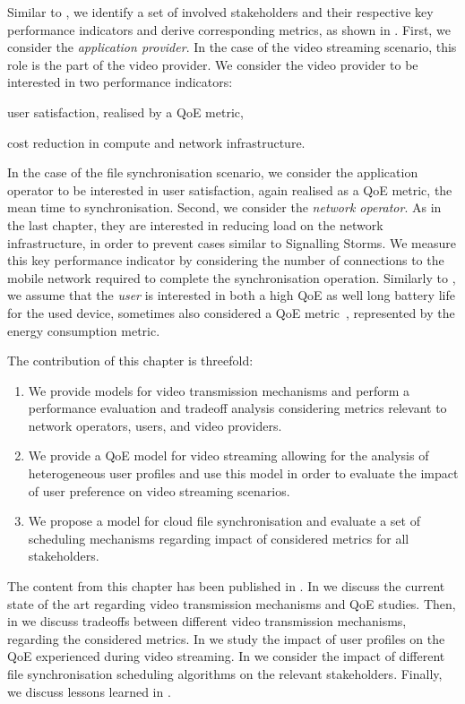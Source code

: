 Similar to , we identify a set of involved stakeholders and their respective key performance indicators and derive corresponding metrics, as shown in .
First, we consider the \emph{application provider}. 
In the case of the video streaming scenario, this role is the part of the video provider.
We consider the video provider to be interested in two performance indicators: 
\begin{enumerate*}
\item user satisfaction, realised by a \gls{QoE} metric,
\item cost reduction in compute and network infrastructure.
\end{enumerate*}
In the case of the file synchronisation scenario, we consider the application operator to be interested in user satisfaction, again realised as a \gls{QoE} metric, the mean time to synchronisation.
Second, we consider the \emph{network operator}.
As in the last chapter, they are interested in reducing load on the network infrastructure, in order to prevent cases similar to Signalling Storms.
We measure this key performance indicator by considering the number of connections to the mobile network required to complete the synchronisation operation.
Similarly to , we assume that the \emph{user} is interested in both a high \gls{QoE} as well long battery life for the used device, sometimes also considered a \gls{QoE} metric~\cite{Ickin2012}, represented by the energy consumption metric. 

The contribution of this chapter is threefold:
\begin{enumerate}
\item We provide models for video transmission mechanisms and perform a performance evaluation and tradeoff analysis considering metrics relevant to network operators, users, and video providers.
\item We provide a \gls{QoE} model for video streaming allowing for the analysis of heterogeneous user profiles and use this model in order to evaluate the impact of user preference on video streaming scenarios.
\item We propose a model for cloud file synchronisation and evaluate a set of scheduling mechanisms regarding impact of considered metrics for all stakeholders.
\end{enumerate}

The content from this chapter has been published in \cite{Schwartz2013b, Hossfeld2015, Schwartz2014a}.
In  we discuss the current state of the art regarding video transmission mechanisms and \gls{QoE} studies.
Then, in  we discuss tradeoffs between different video transmission mechanisms, regarding the considered metrics.
In  we study the impact of user profiles on the \gls{QoE} experienced during video streaming.
In  we consider the impact of different file synchronisation scheduling algorithms on the relevant stakeholders.
Finally, we discuss lessons learned in .





